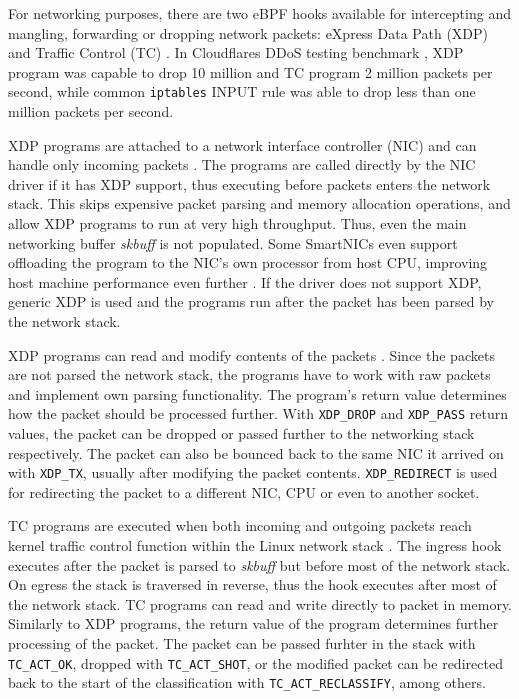 \documentclass[english,12pt,a4paper,pdftex,sci,utf8]{aaltothesis}
\begin{document}
For networking purposes, there are two eBPF hooks available for intercepting and mangling, forwarding or dropping network packets: eXpress Data Path (XDP) and Traffic Control (TC) \cite{miano2021framework}. In Cloudflares DDoS testing benchmark \cite{cloudflare-xdp}, XDP program was capable to drop 10 million and TC program 2 million packets per second, while common \texttt{iptables} INPUT rule was able to drop less than one million packets per second.

XDP programs are attached to a network interface controller (NIC) and can handle only incoming packets \cite{hoiland2018express}. The programs are called directly by the NIC driver if it has XDP support, thus executing before packets enters the network stack. This skips expensive packet parsing and memory allocation operations, and allow XDP programs to run at very high throughput. Thus, even the main networking buffer \textit{skbuff} is not populated. Some SmartNICs even support offloading the program to the NIC's own processor from host CPU, improving host machine performance even further \cite{cilium-program-types}. If the driver does not support XDP, generic XDP is used and the programs run after the packet has been parsed by the network stack.

XDP programs can read and modify contents of the packets \cite{vieira2020fast}. Since the packets are not parsed the network stack, the programs have to work with raw packets and implement own parsing functionality. The program's return value determines how the packet should be processed further. With \texttt{XDP\_DROP} and \texttt{XDP\_PASS} return values, the packet can be dropped or passed further to the networking stack respectively. The packet can also be bounced back to the same NIC it arrived on with \texttt{XDP\_TX}, usually after modifying the packet contents. \texttt{XDP\_REDIRECT} is used for redirecting the packet to a different NIC, CPU or even to another socket.

TC programs are executed when both incoming and outgoing packets reach kernel traffic control function within the Linux network stack \cite{vieira2020fast}. The ingress hook executes after the packet is parsed to \textit{skbuff} but before most of the network stack. On egress the stack is traversed in reverse, thus the hook executes after most of the network stack. TC programs can read and write directly to packet in memory. Similarly to XDP programs, the return value of the program determines further processing of the packet. The packet can be passed furhter in the stack with \texttt{TC\_ACT\_OK}, dropped with \texttt{TC\_ACT\_SHOT}, or the modified packet can be redirected back to the start of the classification with \texttt{TC\_ACT\_RECLASSIFY}, among others.
\end{document}
